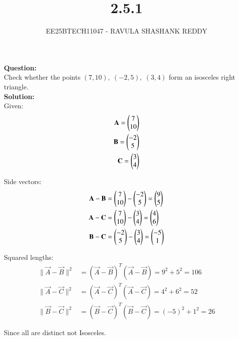 \documentclass[journal]{article}
\begin{document}
	
	
	\vspace{3cm}
	
\title{2.5.1}
\author{EE25BTECH11047 - RAVULA SHASHANK REDDY}
\maketitle
\hrulefill
\bigskip 

\renewcommand{\thetable}{\theenumi}
\setlength{\intextsep}{10pt}
\textbf{Question:} \\

Check whether the points \( (7,10),\; (-2,5),\; (3,4) \) form an isosceles right triangle.\\

\textbf{Solution:}\\

Given:
\begin{align}
\mathbf{A} = \begin{pmatrix}7 \\ 10\end{pmatrix} \\
\mathbf{B} = \begin{pmatrix}-2 \\ 5\end{pmatrix} \\
\mathbf{C} = \begin{pmatrix}3 \\ 4\end{pmatrix}
\end{align}

Side vectors:
\begin{align}
\mathbf{A}-\mathbf{B} &= \begin{pmatrix}7 \\ 10\end{pmatrix} - \begin{pmatrix}-2 \\ 5\end{pmatrix} = \begin{pmatrix}9 \\ 5\end{pmatrix} \\
\mathbf{A}-\mathbf{C} &= \begin{pmatrix}7 \\ 10\end{pmatrix} - \begin{pmatrix}3 \\ 4\end{pmatrix} = \begin{pmatrix}4 \\ 6\end{pmatrix} \\
\mathbf{B}-\mathbf{C} &= \begin{pmatrix}-2 \\ 5\end{pmatrix} - \begin{pmatrix}3 \\ 4\end{pmatrix} = \begin{pmatrix}-5 \\ 1\end{pmatrix}
\end{align}

Squared lengths:
\begin{align}
\|\vec{A}-\vec{B}\|^2 &= (\vec{A}-\vec{B})^T(\vec{A}-\vec{B})
= 9^2 + 5^2 = 106 \\
\|\vec{A}-\vec{C}\|^2 &= (\vec{A}-\vec{C})^T(\vec{A}-\vec{C})
= 4^2 + 6^2 = 52 \\
\|\vec{B}-\vec{C}\|^2 &= (\vec{B}-\vec{C})^T(\vec{B}-\vec{C})
= (-5)^2 + 1^2 = 26
\end{align}
\begin{center}
                    Since all are distinct not Isosceles.\\
\end{center}
\end{document}
